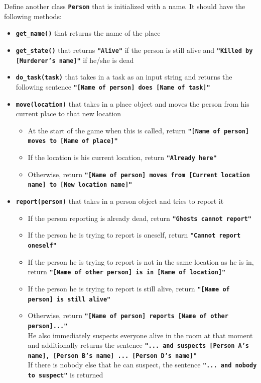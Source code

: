 Define another class \texttt{\bfseries Person} that is initialized with a name. It should have the following
methods:
\begin{itemize}
\item \texttt{\bfseries get\_name()} that returns the name of the place
\item \texttt{\bfseries get\_state()} that returns \texttt{\bfseries "Alive"} if the person is still alive and 
\texttt{\bfseries "Killed by [Murderer's name]"} if he/she is dead
\item \texttt{\bfseries do\_task(task)} that takes in a task as an input string and returns the following
sentence \texttt{\bfseries "[Name of person] does [Name of task]"}
\item \texttt{\bfseries move(location)} that takes in a place object and moves the person from his current
place to that new location
\begin{itemize}
\item At the start of the game when this is called, return \texttt{\bfseries "[Name of person]
moves to [Name of place]"}
\item If the location is his current location, return \texttt{\bfseries "Already here"}
\item Otherwise, return \texttt{\bfseries "[Name of person] moves from [Current location name] to [New location name]"}
\end{itemize}
\item \texttt{\bfseries report(person)} that takes in a person object and tries to report it
\begin{itemize}
\item If the person reporting is already dead, return \texttt{\bfseries "Ghosts cannot report"}
\item If the person he is trying to report is oneself, return \texttt{\bfseries "Cannot report oneself"}
\item If the person he is trying to report is not in the same location as he is in, return
\texttt{\bfseries "[Name of other person] is in [Name of location]"}
\item If the person he is trying to report is still alive, return \texttt{\bfseries "[Name of person]
is still alive"}
\item Otherwise, return \texttt{\bfseries "[Name of person] reports [Name of other
person]..."} \\
He also immediately suspects everyone alive in the room at that moment and additionally returns the sentence 
\texttt{\bfseries "... and suspects [Person A's name], [Person B's name] ... [Person D's name]"} \\
If there is nobody else that he can suspect, the sentence \texttt{\bfseries "... and
nobody to suspect"} is returned
\end{itemize}
\end{itemize}

